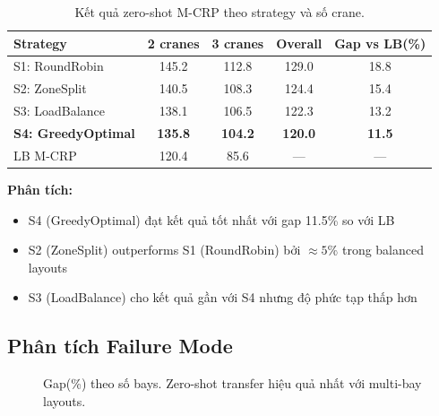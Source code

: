 \documentclass[11pt,a4paper]{article}
\theoremstyle{definition}
\newcommand{\1}{\mathbbm{1}}
\begin{document}
\begin{table}[h!]
    \centering
    \caption{Kết quả zero-shot M-CRP theo strategy và số crane.}
    \label{tab:mc}
    \begin{tabularx}{\textwidth}{lcccc}
        \toprule
        Strategy & 2 cranes & 3 cranes & Overall & Gap vs LB(\%) \\
        \midrule
        S1: RoundRobin & 145.2 & 112.8 & 129.0 & 18.8 \\
        S2: ZoneSplit & 140.5 & 108.3 & 124.4 & 15.4 \\
        S3: LoadBalance & 138.1 & 106.5 & 122.3 & 13.2 \\
        \textbf{S4: GreedyOptimal} & \textbf{135.8} & \textbf{104.2} & \textbf{120.0} & \textbf{11.5} \\
        \midrule
        LB M-CRP & 120.4 & 85.6 & --- & --- \\
        \bottomrule
    \end{tabularx}
\end{table}

\textbf{Phân tích:}
\begin{itemize}
    \item S4 (GreedyOptimal) đạt kết quả tốt nhất với gap 11.5\% so với LB
    \item S2 (ZoneSplit) outperforms S1 (RoundRobin) bởi $\approx 5\%$ trong balanced layouts
    \item S3 (LoadBalance) cho kết quả gần với S4 nhưng độ phức tạp thấp hơn
\end{itemize}

\subsection{Phân tích Failure Mode}

\begin{figure}[h!]
    \centering
    \caption{Gap(\%) theo số bays. Zero-shot transfer hiệu quả nhất với multi-bay layouts.}
    \label{fig:failure}
\end{figure}
\end{document}
